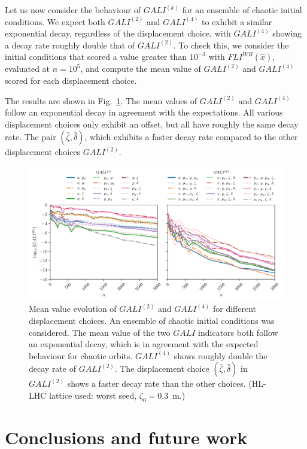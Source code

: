 Let us now consider the behaviour of $GALI^{(k)}$ for an ensemble of chaotic initial conditions. We expect both $GALI^{(2)}$ and $GALI^{(4)}$ to exhibit a similar exponential decay, regardless of the displacement choice, with $GALI^{(4)}$ showing a decay rate roughly double that of $GALI^{(2)}$. To check this, we consider the initial conditions that scored a value greater than $10^{-3}$ with $FLI^{WB}(\hat{x})$, evaluated at $n=10^{5}$, and compute the mean value of $GALI^{(2)}$ and $GALI^{(4)}$ scored for each displacement choice.

The results are shown in Fig.~\ref{fig:gali2_4_chaos}. The mean values of $GALI^{(2)}$ and $GALI^{(4)}$ follow an exponential decay in agreement with the expectations. All various displacement choices only exhibit an offset, but all have roughly the same decay rate. The pair $(\hat{\zeta}, \hat{\delta})$, which exhibits a faster decay rate compared to the other displacement choices $GALI^{(2)}$.  

\begin{figure}
    \centering
    \includegraphics[width=1.0\textwidth]{6_lhc_dynamic_indicators/figs/gali_2_4_chaos.pdf}
    \caption{Mean value evolution of $GALI^{(2)}$ and $GALI^{(4)}$ for different displacement choices. An ensemble of chaotic initial conditions was considered. The mean value of the two $GALI$ indicators both follow an exponential decay, which is in agreement with the expected behaviour for chaotic orbits. $GALI^{(4)}$ shows roughly double the decay rate of $GALI^{(2)}$. The displacement choice $(\hat{\zeta}, \hat{\delta})$ in $GALI^{(2)}$ shows a faster decay rate than the other choices. (HL-LHC lattice used: worst seed, $\zeta_0=$\SI{0.3}{\meter}.)}
    \label{fig:gali2_4_chaos}
\end{figure}


\section{Conclusions and future work}\label{sec:8:conclusions}

